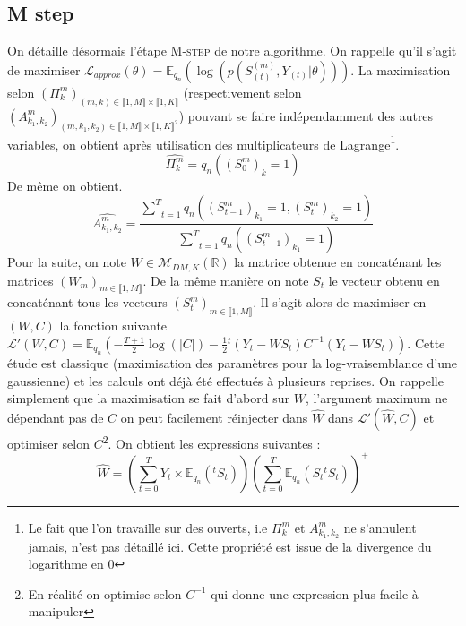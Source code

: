\documentclass[10pt,a4paper]{article}
\newcommand{\Mstep}{\textsc{M-step}}
\begin{document}
\subsection{M step}
On détaille désormais l'étape \Mstep{} de notre algorithme. On rappelle qu'il 
s'agit de maximiser $\mathcal{L}_{approx}(\theta)=\mathbb{E}_{q_n}\left( \log 
\left( p(S_{(t)}^{(m)},Y_{(t)}\vert \theta)\right)\right)$. La maximisation 
selon $(\Pi_{k}^m)_{(m,k) \in \llbracket 1,M \rrbracket \times \llbracket 1,K 
\rrbracket}$ (respectivement selon $(A_{k_1,k_2}^m)_{(m,k_1,k_2) \in \llbracket 
1,M \rrbracket \times \llbracket 1,K \rrbracket^2}$) pouvant se faire 
indépendamment des autres variables, on obtient après utilisation des 
multiplicateurs de Lagrange\footnote{Le fait que l'on travaille sur des 
ouverts, i.e $\Pi_{k}^m$ et $A_{k_1,k_2}^m$ ne s'annulent jamais, n'est pas 
détaillé ici. Cette propriété est issue de la divergence du logarithme en $0$}.
\begin{equation}
\widehat{\Pi_k^m}=q_{n}((S_0^m)_k=1)
\end{equation}
De même on obtient.
\begin{equation}
\widehat{A_{k_1,k_2}^m}=\frac{\underset{t=1}{\overset{T}{\sum}}q_n((S_{t-1}^m)_{
k_1}=1,(S_t^m)_{k_2}=1)}{\underset{t=1}{\overset{T}{\sum}}q_n((S_{t-1}^m)_{k_1}
=1)}
\end{equation}
Pour la suite, on note $W \in \mathcal{M}_{DM,K}(\mathbb{R})$ la matrice 
obtenue en concaténant les matrices $(W_m)_{m \in \llbracket 1,M \rrbracket}$. 
De la même manière on note $S_t$ le vecteur obtenu en concaténant tous les 
vecteurs $(S_t^m)_{m \in \llbracket 1,M \rrbracket}$. Il s'agit alors de 
maximiser en $(W,C)$ la fonction suivante 
$\mathcal{L}'(W,C)=\mathbb{E}_{q_n}\left(-\frac{T+1}{2} \log(\vert C \vert) 
-\frac{1}{2} {}^t\left(Y_t-WS_t \right)C^{-1} \left( Y_t-WS_t\right)\right)$. 
Cette étude est classique (maximisation des paramètres pour la 
log-vraisemblance d'une gaussienne) et les calculs ont déjà été effectués à 
plusieurs reprises. On rappelle simplement que la maximisation se fait d'abord 
sur $W$, l'argument maximum ne dépendant pas de $C$ on peut facilement 
réinjecter dans $\widehat{W}$ dans $\mathcal{L}'(\widehat{W},C)$ et optimiser 
selon $C$\footnote{En réalité on optimise selon $C^{-1}$ qui donne une 
expression plus facile à manipuler}. On obtient les expressions suivantes :
\begin{equation}
\widehat{W}=\left( \underset{t=0}{\overset{T}{\sum}} Y_t \times 
\mathbb{E}_{q_n}({}^tS_t) \right) \left( \underset{t=0}{\overset{T}{\sum}} 
\mathbb{E}_{q_n}\left( S_t {}^t S_t\right)\right)^+
\end{equation}
\end{document}
